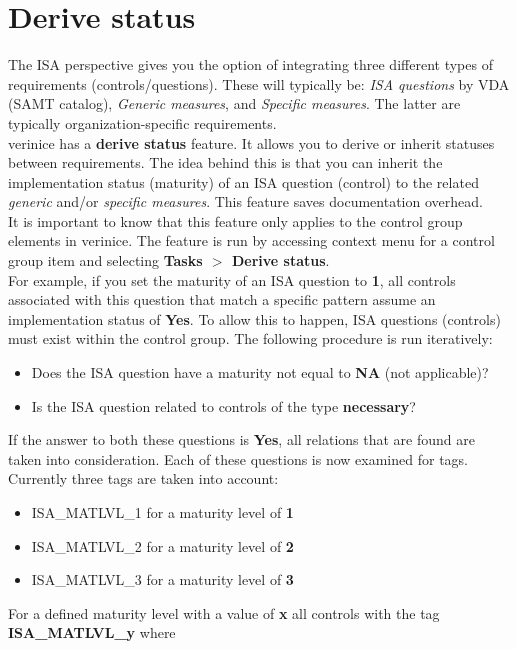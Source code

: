 \documentclass[a4paper,10pt]{book}
\begin{document}
\section{Derive status}
The ISA perspective gives you the option of integrating three different types of requirements (controls/questions).
These will typically be: {\em ISA questions} by VDA (SAMT catalog), {\em Generic measures}, and {\em Specific measures}.
The latter are typically organization-specific requirements.
\newline\\
verinice has a \textbf{derive status} feature. It allows you to derive or inherit statuses between requirements. The idea
behind this is that you can inherit the implementation status (maturity) of an ISA question (control) to the related
{\em generic} and/or {\em specific measures}. This feature saves documentation overhead.
\newline\\
It is important to know that this feature only applies to the control group elements in verinice. The feature is run by
accessing context menu for a control group item and selecting \textbf{Tasks $>$ Derive status}.
\newline\\
For example, if you set the maturity of an ISA question to \textbf{1}, all controls associated with this question that
match a specific pattern assume an implementation status of \textbf{Yes}. To allow this to happen, ISA questions (controls)
must exist within the control group. The following procedure is run iteratively:
\begin{itemize}
\item Does the ISA question have a maturity not equal to \textbf{NA} (not applicable)?
\item Is the ISA question related to controls of the type \textbf{necessary}?
\end{itemize}
If the answer to both these questions is \textbf{Yes}, all relations that are found are taken into consideration. Each of
these questions is now examined for tags. Currently three tags are taken into account:
\begin{itemize}
 \item ISA\_MATLVL\_1 for a maturity level of \textbf{1}
 \item ISA\_MATLVL\_2 for a maturity level of \textbf{2}
 \item ISA\_MATLVL\_3 for a maturity level of \textbf{3}
\end{itemize}
For a defined maturity level with a value of \textbf{x} all controls with the tag \textbf{ISA\_MATLVL\_y} where
\end{document}

